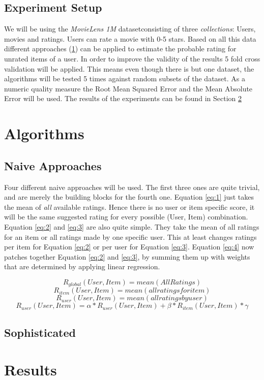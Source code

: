 \documentclass{article}[]
\begin{document}
\subsection{Experiment Setup}
\label{sec:setup}
We will be using the \emph{MovieLens 1M} datasetconsisting of three \emph{collections}: Users, movies and ratings\cite{harper2016movielens}. Users can rate a movie with 0-5 stars. Based on all this data different approaches (\ref{sec:algorithms}) can be applied to estimate the probable rating for unrated items of a user.
In order to improve the validity of the results 5 fold cross validation will be applied. This means even though there is but one dataset, the algorithms will be tested 5 times against random subsets of the dataset.
As a numeric quality measure the Root Mean Squared Error and the Mean Absolute Error will be used.
The results of the experiments can be found in Section \ref{sec:result}

\section{Algorithms}
\label{sec:algorithms}
\subsection{Naive Approaches}
Four different naive approaches will be used\cite{slides}. The first three ones are quite trivial, and are merely the building blocks for the fourth one.
Equation \ref{eq:1} just takes the mean of \emph{all} available ratings. Hence there is no user or item specific score, it will be the same suggested rating for every possible (User, Item) combination. Equation \ref{eq:2} and \ref{eq:3} are also quite simple. They take the mean of all ratings for an item or all ratings made by one specific user. This at least changes ratings per item for Equation \ref{eq:2} or per user for Equation \ref{eq:3}.
Equation \ref{eq:4} now patches together Equation \ref{eq:2} and \ref{eq:3}, by summing them up with weights that are determined by applying linear regression.

\begin{equation}
\label{eq:1}
R_{global}(User, Item) = mean(All Ratings)
\end{equation}
\begin{equation}
\label{eq:2}
R_{item}(User, Item) = mean(all ratings for item)
\end{equation}
\begin{equation}
\label{eq:3}
R_{user}(User, Item) = mean(all ratings by user)
\end{equation}
\begin{equation}
\label{eq:4}
R_{user}(User, Item) = \alpha * R_{user}(User, Item) + \beta * R_{item}(User, Item) * \gamma
\end{equation}

\subsection{Sophisticated}

\section{Results}
\label{sec:result}


 

	
	
\end{document}
